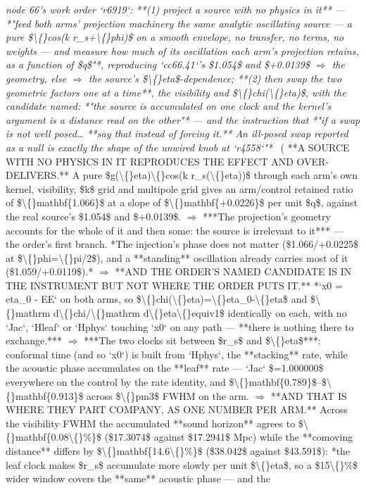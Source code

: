 \begin{description}
\textit{node 66's work order `r6919`: **(1) project a source with no physics in it** --- *"feed both arms' projection machinery the same analytic oscillating source --- a pure \$\textbackslash\{\}cos(k r\_s+\textbackslash\{\}phi)\$ on a smooth envelope, no transfer, no terms, no weights --- and measure how much of its oscillation each arm's projection retains, as a function of \$q\$"*, reproducing `cc66.41`'s \$1.054\$ and \$+0.0139\$ \ensuremath{\Rightarrow} the geometry, else \ensuremath{\Rightarrow} the source's \$\textbackslash\{\}eta\$-dependence; **(2) then swap the two geometric factors one at a time**, the visibility and \$\textbackslash\{\}chi(\textbackslash\{\}eta)\$, with the candidate named: *"the source is accumulated on one clock and the kernel's argument is a distance read on the other"* --- and the instruction that *"if a swap is not well posed\ldots{} **say that instead of forcing it.** An ill-posed swap reported as a null is exactly the shape of the unwired knob at `r4558`"*} \ ( **A SOURCE WITH NO PHYSICS IN IT REPRODUCES THE EFFECT AND OVER-DELIVERS.** A pure \$g(\textbackslash\{\}eta)\textbackslash\{\}cos(k r\_s(\textbackslash\{\}eta))\$ through each arm's own kernel, visibility, \$k\$ grid and multipole grid gives an arm/control retained ratio of \$\textbackslash\{\}mathbf\{1.066\}\$ at a slope of \$\textbackslash\{\}mathbf\{+0.0226\}\$ per unit \$q\$, against the real source's \$1.054\$ and \$+0.0139\$. \ensuremath{\Rightarrow} ***The projection's geometry accounts for the whole of it and then some: the source is irrelevant to it*** --- the order's first branch.  *The injection's phase does not matter (\$1.066/+0.0225\$ at \$\textbackslash\{\}phi=\textbackslash\{\}pi/2\$), and a **standing** oscillation already carries most of it (\$1.059/+0.0119\$).* \ensuremath{\Rightarrow}  **AND THE ORDER'S NAMED CANDIDATE IS IN THE INSTRUMENT BUT NOT WHERE THE ORDER PUTS IT.** *`x0 = eta\_0 - EE` on both arms, so \$\textbackslash\{\}chi(\textbackslash\{\}eta)=\textbackslash\{\}eta\_0-\textbackslash\{\}eta\$ and \$\textbackslash\{\}mathrm d\textbackslash\{\}chi/\textbackslash\{\}mathrm d\textbackslash\{\}eta\textbackslash\{\}equiv1\$ identically on each, with no `Jac`, `Hleaf` or `Hphys` touching `x0` on any path --- **there is nothing there to exchange.*** \ensuremath{\Rightarrow} ***The two clocks sit between \$r\_s\$ and \$\textbackslash\{\}eta\$***: conformal time (and so `x0`) is built from `Hphys`, the **stacking** rate, while the acoustic phase accumulates on the **leaf** rate --- `Jac` \$=1.000000\$ everywhere on the control by the rate identity, and \$\textbackslash\{\}mathbf\{0.789\}\$--\$\textbackslash\{\}mathbf\{0.913\}\$ across \$\textbackslash\{\}pm3\$ FWHM on the arm. \ensuremath{\Rightarrow}  **AND THAT IS WHERE THEY PART COMPANY, AS ONE NUMBER PER ARM.** Across the visibility FWHM the accumulated **sound horizon** agrees to \$\textbackslash\{\}mathbf\{0.08\textbackslash\{\}\%\}\$ (\$17.3074\$ against \$17.2941\$ Mpc) while the **comoving distance** differs by \$\textbackslash\{\}mathbf\{14.6\textbackslash\{\}\%\}\$ (\$38.042\$ against \$43.591\$): *the leaf clock makes \$r\_s\$ accumulate more slowly per unit \$\textbackslash\{\}eta\$, so a \$15\textbackslash\{\}\%\$ wider window covers the **same** acoustic phase --- and the 
\end{description}
